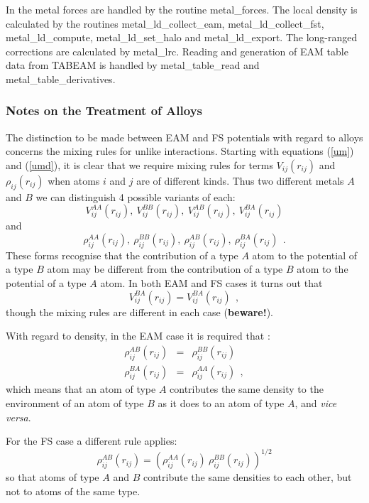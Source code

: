In \D the metal forces are handled by the routine {\sc
metal\_forces}.  The local density is calculated by the routines
{\sc metal\_ld\_collect\_eam}, {\sc metal\_ld\_collect\_fst},
{\sc metal\_ld\_compute}, {\sc metal\_ld\_set\_halo} and
{\sc metal\_ld\_export}.  The long-ranged corrections are calculated by
{\sc metal\_lrc}.  Reading and generation of EAM table data from TABEAM
is handled by {\sc metal\_table\_read} and {\sc metal\_table\_derivatives}.

\subsubsection*{Notes on the Treatment of Alloys}

The distinction to be made between EAM and FS potentials with regard to
alloys concerns the mixing rules for unlike interactions.  Starting with
equations (\ref{um}) and (\ref{umd}), it is clear that we require mixing
rules for terms $V_{ij}(r_{ij})$ and $\rho_{ij}(r_{ij})$ when atoms $i$
and $j$ are of different kinds.  Thus two different metals $A$ and $B$ we
can distinguish 4 possible variants of each:
\[V^{AA}_{ij}(r_{ij}),~V^{BB}_{ij}(r_{ij}),~V^{AB}_{ij}(r_{ij}),
~V^{BA}_{ij}(r_{ij})\]
and
\[\rho^{AA}_{ij}(r_{ij}),~\rho^{BB}_{ij}(r_{ij}),~\rho^{AB}_{ij}(r_{ij}),
~\rho^{BA}_{ij}(r_{ij})~~.\]
These forms recognise that the contribution of a type $A$ atom to
the potential of a type $B$ atom may be different from the
contribution of a type $B$ atom to the potential of a type $A$ atom.
In both EAM \cite{johnson-89a} and FS \cite{sutton-91a} cases it
turns out that
\begin{equation}
V^{BA}_{ij}(r_{ij})=V^{BA}_{ij}(r_{ij})~~,
\end{equation}
though the mixing rules are different in each case ({\bf beware!}).

With regard to density, in the EAM case it is required that
\cite{johnson-89a}:
\begin{eqnarray}
\rho^{AB}_{ij}(r_{ij})&=&\rho^{BB}_{ij}(r_{ij}) \nonumber \\
\rho^{BA}_{ij}(r_{ij})&=&\rho^{AA}_{ij}(r_{ij})~~,
\end{eqnarray}
which means that an atom of type $A$ contributes the same density to
the environment of an atom of type $B$ as it does to an atom of type
$A$, and {\em vice versa}.

For the FS case \cite{sutton-91a} a different rule applies:
\begin{equation}
\rho^{AB}_{ij}(r_{ij})=(\rho^{AA}_{ij}(r_{ij})~\rho^{BB}_{ij}(r_{ij}))^{1/2}
\end{equation}
so that atoms of type $A$ and $B$ contribute the same densities to
each other, but not to atoms of the same type.

